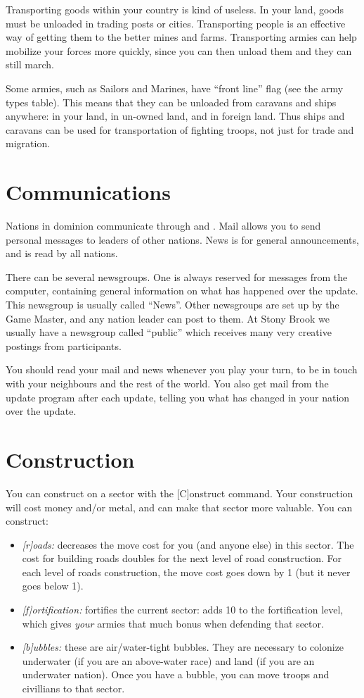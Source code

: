 Transporting goods within your country is kind of useless.  In your
land, goods must be unloaded in trading posts or cities.  Transporting
people is an effective way of getting them to the better mines and
farms.  Transporting armies can help mobilize your forces more
quickly, since you can then unload them and they can still march.

Some armies, such as Sailors and Marines, have ``front line'' flag
(see the army types table).  This means that they can be unloaded from
caravans and ships anywhere: in your land, in un-owned land, and in
foreign land.  Thus ships and caravans can be used for transportation
of fighting troops, not just for trade and migration.

\section{Communications}
Nations in dominion communicate through  and .  Mail
allows you to send personal messages to leaders of other nations.
News is for general announcements, and is read by all nations.

There can be several newsgroups.  One is always reserved for messages
from the computer, containing general information on what has happened
over the update.  This newsgroup is usually called ``News''.  Other
newsgroups are set up by the Game Master, and any nation leader can
post to them.  At Stony Brook we usually have a newsgroup called
``public'' which receives many very creative postings from
participants.

You should read your mail and news whenever you play your turn, to be
in touch with your neighbours and the rest of the world.  You also get
mail from the update program after each update, telling you what has
changed in your nation over the update.

\section{Construction}
You can construct on a sector with the [C]onstruct command.  Your
construction will cost money and/or metal, and can make that sector
more valuable.  You can construct:
\begin{itemize}
\item
\emph{[r]oads:} decreases the move cost for you (and anyone else) in this
sector.  The cost for building roads doubles for the next level of
road construction.  For each level of roads construction, the move
cost goes down by 1 (but it never goes below 1).
\item
\emph{[f]ortification:} fortifies the current sector: adds 10 to the
fortification level, which gives \emph{your} armies that much bonus
when defending that sector.
\item
\emph{[b]ubbles:} these are air/water-tight bubbles.  They are necessary
to colonize underwater (if you are an above-water race) and land (if you
are an underwater nation).  Once you have a bubble, you can move
troops and civillians to that sector.
\end{itemize}

